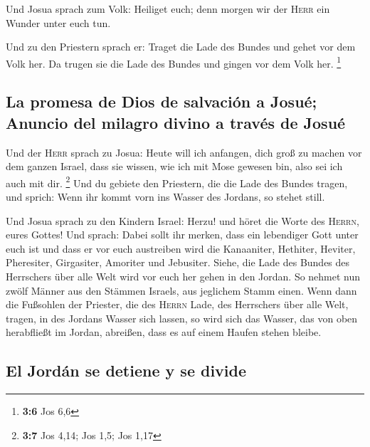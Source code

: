  Und Josua sprach zum Volk: Heiliget euch; denn morgen wir
der \textsc{Herr} ein Wunder unter euch tun.

 Und zu den Priestern sprach er: Traget die Lade des
Bundes und gehet vor dem Volk her. Da trugen sie die Lade des Bundes und
gingen vor dem Volk her. \footnote{\textbf{3:6} Jos 6,6}

\hypertarget{la-promesa-de-dios-de-salvaciuxf3n-a-josuuxe9-anuncio-del-milagro-divino-a-travuxe9s-de-josuuxe9}{%
\subsection{La promesa de Dios de salvación a Josué; Anuncio del milagro
divino a través de
Josué}\label{la-promesa-de-dios-de-salvaciuxf3n-a-josuuxe9-anuncio-del-milagro-divino-a-travuxe9s-de-josuuxe9}}

 Und der \textsc{Herr} sprach zu Josua: Heute will ich
anfangen, dich groß zu machen vor dem ganzen Israel, dass sie wissen,
wie ich mit Mose gewesen bin, also sei ich auch mit dir. \footnote{\textbf{3:7}
  Jos 4,14; Jos 1,5; Jos 1,17}  Und du gebiete den
Priestern, die die Lade des Bundes tragen, und sprich: Wenn ihr kommt
vorn ins Wasser des Jordans, so stehet still.

 Und Josua sprach zu den Kindern Israel: Herzu! und höret
die Worte des \textsc{Herrn}, eures Gottes!  Und sprach:
Dabei sollt ihr merken, dass ein lebendiger Gott unter euch ist und dass
er vor euch austreiben wird die Kanaaniter, Hethiter, Heviter,
Pheresiter, Girgasiter, Amoriter und Jebusiter.  Siehe,
die Lade des Bundes des Herrschers über alle Welt wird vor euch her
gehen in den Jordan.  So nehmet nun zwölf Männer aus den
Stämmen Israels, aus jeglichem Stamm einen.  Wenn dann
die Fußsohlen der Priester, die des \textsc{Herrn} Lade, des Herrschers
über alle Welt, tragen, in des Jordans Wasser sich lassen, so wird sich
das Wasser, das von oben herabfließt im Jordan, abreißen, dass es auf
einem Haufen stehen bleibe.

\hypertarget{el-jorduxe1n-se-detiene-y-se-divide}{%
\subsection{El Jordán se detiene y se
divide}\label{el-jorduxe1n-se-detiene-y-se-divide}}

